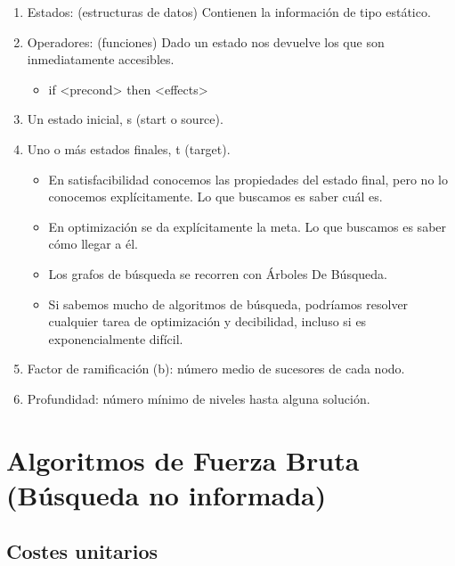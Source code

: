 \documentclass[12pt, twoside, openright]{report} %
\begin{document}
\begin{enumerate}
	\item Estados: (estructuras de datos) Contienen la información de tipo
	      estático.
	\item Operadores: (funciones) Dado un estado nos devuelve los que son
	      inmediatamente accesibles.

	      \begin{itemize}
		      \item if <precond> then <effects>
	      \end{itemize}
	\item Un estado inicial, s (start o source).
	\item Uno o más estados finales, t (target).

	      \begin{itemize}
		      \item En satisfacibilidad conocemos las propiedades del estado final, pero
		            no lo conocemos explícitamente. Lo que buscamos es saber cuál es.
		      \item En optimización se da explícitamente la meta. Lo que buscamos es
		            saber cómo llegar a él.
		      \item Los grafos de búsqueda se recorren con Árboles De Búsqueda.
		      \item Si sabemos mucho de algoritmos de búsqueda, podríamos resolver
		            cualquier tarea de optimización y decibilidad, incluso si es
		            exponencialmente difícil.
	      \end{itemize}
	\item Factor de ramificación (b): número medio de sucesores de cada nodo.
	\item Profundidad: número mínimo de niveles hasta alguna solución.
\end{enumerate}

\section{Algoritmos de Fuerza Bruta (Búsqueda no informada)}
\subsection{Costes unitarios}
\end{document}
